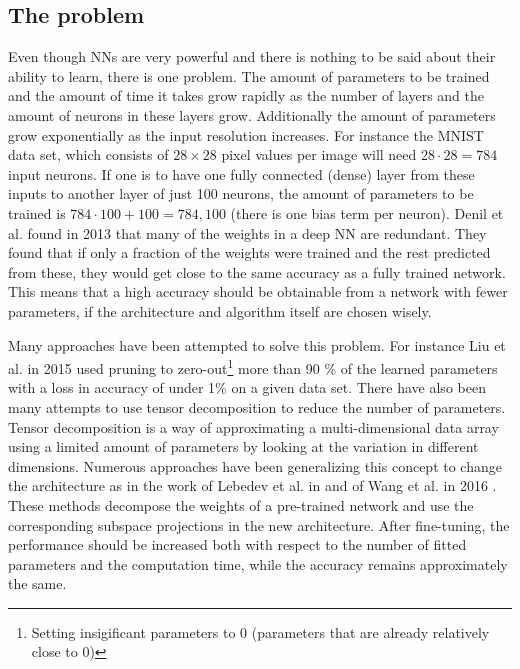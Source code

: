 \subsection{The problem}
Even though NNs are very powerful and there is nothing to be said about their ability to learn, there is one problem. The amount of parameters to be trained and the amount of time it takes grow rapidly as the number of layers and the amount of neurons in these layers grow. Additionally the amount of parameters grow exponentially as the input resolution increases. For instance the MNIST data set, which consists of $28\times28$ pixel values per image will need $28\cdot28 = 784$ input neurons. If one is to have one fully connected (dense) layer from these inputs to another layer of just 100 neurons, the amount of parameters to be trained is $784 \cdot 100 + 100 = 784,100$ (there is one bias term per neuron). Denil et al. found in 2013 that many of the weights in a deep NN are redundant\cite{Denil2013}. They found that if only a fraction of the weights were trained and the rest predicted from these, they would get close to the same accuracy as a fully trained network. This means that a high accuracy should be obtainable from a network with fewer parameters, if the architecture and algorithm itself are chosen wisely.

Many approaches have been attempted to solve this problem. For instance Liu et al. in 2015 used pruning to zero-out\footnote{Setting insigificant parameters to 0 (parameters that are already relatively close to 0)} more than 90 \% of the learned parameters with a loss in accuracy of under 1\% on a given data set. There have also been many attempts to use tensor decomposition to reduce the number of parameters. Tensor decomposition is a way of approximating a multi-dimensional data array using a limited amount of parameters by looking at the variation in different dimensions. Numerous approaches have been generalizing this concept to change the architecture as in the work of Lebedev et al. in \cite{Lebedev2015} and of Wang et al. in 2016 \cite{Wang2016}. These methods decompose the weights of a pre-trained network and use the corresponding subspace projections in the new architecture. After fine-tuning, the performance should be increased both with respect to the number of fitted parameters and the computation time, while the accuracy remains approximately the same.

